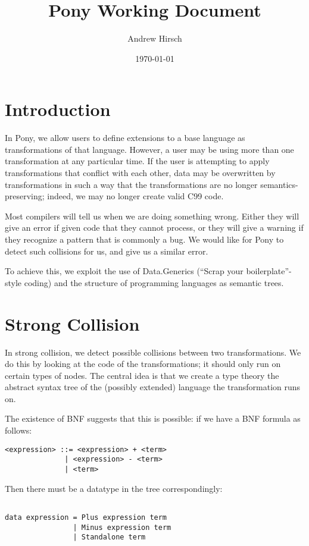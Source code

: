 \documentclass[11pt]{article}
\title{Pony Working Document}
\author{Andrew Hirsch}
\date{\today}
\begin{document}
\maketitle


\section{Introduction}
\label{sec-1}


In Pony, we allow users to define extensions to a base language as transformations of that language. However, a user may be using more than one transformation at any particular time. If the user is attempting to apply transformations that conflict with each other, data may be overwritten by transformations in such a way that the transformations are no longer semantics-preserving; indeed, we may no longer create valid C99 code.

Most compilers will tell us when we are doing something wrong. Either they will give an error if given code that they cannot process, or they will give a warning if they recognize a pattern that is commonly a bug. We would like for Pony to detect such collisions for us, and give us a similar error.

To achieve this, we exploit the use of Data.Generics (``Scrap your boilerplate''-style coding) and the structure of programming languages as semantic trees.
\section{Strong Collision}
\label{sec-2}


In strong collision, we detect possible collisions between two transformations. We do this by looking at the code of the transformations; it should only run on certain types of nodes. The central idea is that we create a type theory the abstract syntax tree of the (possibly extended) language the transformation runs on.

The existence of BNF suggests that this is possible: if we have a BNF formula as follows:

\begin{verbatim}
<expression> ::= <expression> + <term>
              | <expression> - <term>
              | <term>                
\end{verbatim}

Then there must be a datatype in the tree correspondingly:

\begin{lstlisting}

data expression = Plus expression term
                | Minus expression term 
                | Standalone term

\end{lstlisting}
\end{document}
